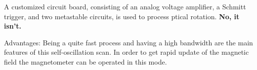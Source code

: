 A customized circuit board, consisting of an analog voltage amplifier,
a Schmitt trigger, and two metastable circuits, is used to process
ptical rotation.  {\bf No, it isn't.}

Advantages: Being a quite fast process and having a high bandwidth are
the main features of this self-oscillation scan. In order to get rapid
update of the magnetic field the magnetometer can be operated in this
mode.

